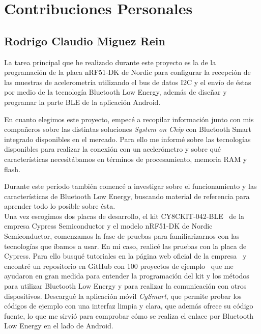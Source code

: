 \newpage %

\section{Contribuciones Personales}
\label{makereference1.4}

\subsection{Rodrigo Claudio Miguez Rein}

La tarea principal que he realizado durante este proyecto es la de la programación de la placa nRF51-DK de Nordic para configurar la recepción de las muestras de acelerometría utilizando el bus de datos I2C y el envío de éstas por medio de la tecnología Bluetooth Low Energy, además de diseñar y programar la parte BLE de la aplicación Android.

En cuanto elegimos este proyecto, empecé a recopilar información junto con mis compañeros sobre las distintas soluciones \textit{System on Chip} con Bluetooth Smart integrado disponibles en el mercado. Para ello me informé sobre las tecnologías disponibles para realizar la conexión con un acelerómetro y sobre qué características necesitábamos en términos de procesamiento, memoria RAM y flash.

Durante este período también comencé a investigar sobre el funcionamiento y las características de Bluetooth Low Energy, buscando material de referencia para aprender todo lo posible sobre ésta.\\

Una vez escogimos dos placas de desarrollo, el kit CY8CKIT-042-BLE~\cite{CypressDatasheet} de la empresa Cypress Semiconductor y el modelo nRF51-DK de Nordic Semiconductor, comenzamos la fase de pruebas para familiarizarnos con las tecnologías que íbamos a usar. En mi caso, realicé las pruebas con la placa de Cypress. Para ello busqué tutoriales en la página web oficial de la empresa~\cite{CypressTutorials} y encontré un repositorio en GitHub con 100 proyectos de ejemplo~\cite{100Projects} que me ayudaron en gran medida para entender la programación del kit y los métodos para utilizar Bluetooth Low Energy y para realizar la comunicación con otros dispositivos. Descargué la aplicación móvil \textit{CySmart}, que permite probar los códigos de ejemplo con una interfaz limpia y clara, que además ofrece su código fuente, lo que me sirvió para comprobar cómo se realiza el enlace por Bluetooth Low Energy en el lado de Android.

